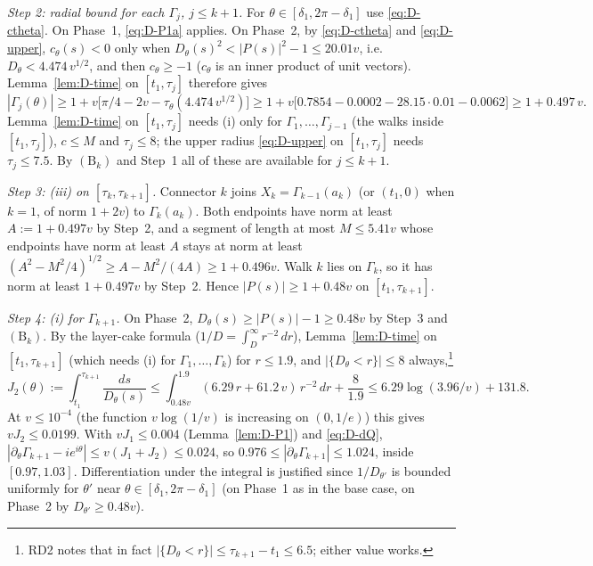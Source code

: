 \smallskip\noindent\emph{Step 2: radial bound for each $\Gamma_j$, $j\le k+1$.} For $\theta\in[\delta_1,2\pi-\delta_1]$ use
\eqref{eq:D-ctheta}. On Phase~1, \eqref{eq:D-P1a} applies. On Phase~2, by \eqref{eq:D-ctheta} and \eqref{eq:D-upper},
$c_\theta(s)<0$ only when $D_\theta(s)^2<|P(s)|^2-1\le20.01v$, i.e.\ $D_\theta<4.474\,v^{1/2}$, and then $c_\theta\ge-1$ ($c_\theta$
is an inner product of unit vectors). Lemma~\ref{lem:D-time} on $[t_1,\tau_j]$ therefore gives
\begin{equation}\label{eq:D-radial}
|\Gamma_j(\theta)|\ge1+v\bigl[\pi/4-2v-\tau_\theta(4.474\,v^{1/2})\bigr]\ge1+v\bigl[0.7854-0.0002-28.15\cdot0.01-0.0062\bigr]\ge1+0.497\,v .
\end{equation}
Lemma~\ref{lem:D-time} on $[t_1,\tau_j]$ needs (i) only for $\Gamma_1,\dots,\Gamma_{j-1}$ (the walks inside $[t_1,\tau_j]$),
$c\le M$ and $\tau_j\le8$; the upper radius \eqref{eq:D-upper} on $[t_1,\tau_j]$ needs $\tau_j\le7.5$. By $(\mathrm B_k)$ and
Step~1 all of these are available for $j\le k+1$.

\smallskip\noindent\emph{Step 3: (iii) on $[\tau_k,\tau_{k+1}]$.} Connector $k$ joins $X_k=\Gamma_{k-1}(a_k)$ (or $(t_1,0)$
when $k=1$, of norm $1+2v$) to $\Gamma_k(a_k)$. Both endpoints have norm at least $A:=1+0.497v$ by Step~2, and a segment of
length at most $M\le5.41v$ whose endpoints have norm at least $A$ stays at norm at least
$(A^2-M^2/4)^{1/2}\ge A-M^2/(4A)\ge1+0.496v$. Walk $k$ lies on $\Gamma_k$, so it has norm at least $1+0.497v$ by Step~2.
Hence $|P(s)|\ge1+0.48v$ on $[t_1,\tau_{k+1}]$.

\smallskip\noindent\emph{Step 4: (i) for $\Gamma_{k+1}$.} On Phase~2, $D_\theta(s)\ge|P(s)|-1\ge0.48v$ by Step~3 and
$(\mathrm B_k)$. By the layer-cake formula ($1/D=\int_D^\infty r^{-2}\,dr$), Lemma~\ref{lem:D-time} on $[t_1,\tau_{k+1}]$
(which needs (i) for $\Gamma_1,\dots,\Gamma_k$) for $r\le1.9$, and $|\{D_\theta<r\}|\le8$ always,\footnote{RD2 notes that in fact
$|\{D_\theta<r\}|\le\tau_{k+1}-t_1\le6.5$; either value works.}
\begin{equation}\label{eq:D-J2}
J_2(\theta):=\int_{t_1}^{\tau_{k+1}}\frac{ds}{D_\theta(s)}\le\int_{0.48v}^{1.9}(6.29\,r+61.2\,v)\,r^{-2}\,dr+\frac{8}{1.9}
\le6.29\log(3.96/v)+131.8 .
\end{equation}
At $v\le10^{-4}$ (the function $v\log(1/v)$ is increasing on $(0,1/e)$) this gives $vJ_2\le0.0199$. With $vJ_1\le0.004$
(Lemma~\ref{lem:D-P1}) and \eqref{eq:D-dQ},
$|\partial_\theta\Gamma_{k+1}-ie^{i\theta}|\le v(J_1+J_2)\le0.024$, so $0.976\le|\partial_\theta\Gamma_{k+1}|\le1.024$, inside
$[0.97,1.03]$. Differentiation under the integral is justified since $1/D_{\theta'}$ is bounded uniformly for $\theta'$ near
$\theta\in[\delta_1,2\pi-\delta_1]$ (on Phase~1 as in the base case, on Phase~2 by $D_{\theta'}\ge0.48v$).

